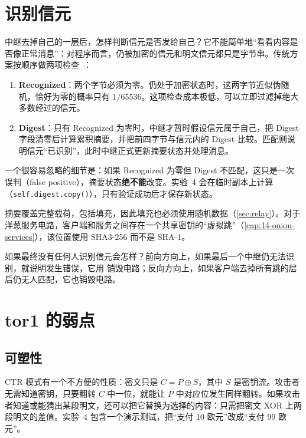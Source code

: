 \section{识别信元}\label{sec:riconoscere}

中继去掉自己的一层后，怎样判断信元是否发给自己？它不能简单地\enquote{看看内容是否像正常消息}：对程序而言，仍被加密的信元和明文信元都只是字节串。传统方案按顺序做两项检查~：

\begin{enumerate}
  \item \textbf{Recognized}：两个字节必须为零。仍处于加密状态时，这两字节近似伪随机，恰好为零的概率只有 $1/\num{65536}$。这项检查成本极低，可以立即过滤掉绝大多数经过的信元。
  \item \textbf{Digest}：只有 Recognized 为零时，中继才暂时假设信元属于自己，把 Digest 字段清零后计算累积摘要，并把前四字节与信元内的 Digest 比较。匹配则说明信元\enquote{已识别}，此时中继正式更新摘要状态并处理消息。
\end{enumerate}

一个很容易忽略的细节是：如果 Recognized 为零但 Digest 不匹配，这只是一次误判（false positive），摘要状态\textbf{绝不能}改变。实验~4 会在临时副本上计算（\texttt{self.digest.copy()}），只有验证成功后才保存新状态。

摘要覆盖完整载荷，包括填充，因此填充也必须使用随机数据（\cref{sec:relay}）。对于洋葱服务电路，客户端和服务之间存在一个共享密钥的\enquote{虚拟跳}（\cref{cap:14-onion-services}），该位置使用 SHA3-256 而不是 SHA-1。

如果最终没有任何人识别信元会怎样？前向方向上，如果最后一个中继仍无法识别，就说明发生错误，它用  销毁电路；反向方向上，如果客户端去掉所有跳的层后仍无人匹配，它也销毁电路。

\section{tor1 的弱点}\label{sec:tor1-debolezze}

\subsection{可塑性}

CTR 模式有一个不方便的性质：密文只是 $C=P\oplus S$，其中 $S$ 是密钥流。攻击者无需知道密钥，只要翻转 $C$ 中一位，就能让 $P$ 中对应位发生同样翻转。如果攻击者知道或能猜出某段明文，还可以把它替换为选择的内容：只需把密文 XOR 上两段明文的差值。实验~4 包含一个演示测试，把\enquote{支付 10 欧元}改成\enquote{支付 99 欧元}。

